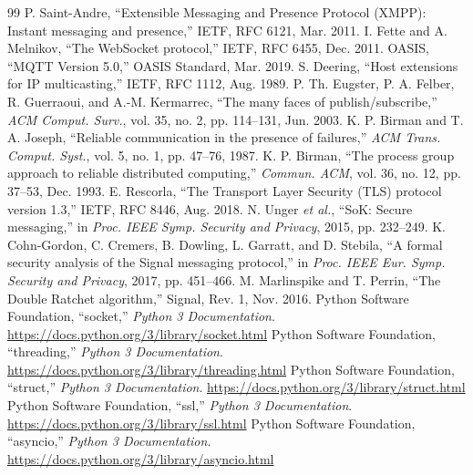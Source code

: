 \documentclass[conference]{IEEEtran}
\begin{document}
\begin{thebibliography}{99}
 P. Saint-Andre, ``Extensible Messaging and Presence Protocol (XMPP): Instant messaging and presence,'' IETF, RFC 6121, Mar. 2011.
 I. Fette and A. Melnikov, ``The WebSocket protocol,'' IETF, RFC 6455, Dec. 2011.
 OASIS, ``MQTT Version 5.0,'' OASIS Standard, Mar. 2019.
 S. Deering, ``Host extensions for IP multicasting,'' IETF, RFC 1112, Aug. 1989.
 P. Th. Eugster, P. A. Felber, R. Guerraoui, and A.-M. Kermarrec, ``The many faces of publish/subscribe,'' \emph{ACM Comput. Surv.}, vol. 35, no. 2, pp. 114--131, Jun. 2003.
 K. P. Birman and T. A. Joseph, ``Reliable communication in the presence of failures,'' \emph{ACM Trans. Comput. Syst.}, vol. 5, no. 1, pp. 47--76, 1987.
 K. P. Birman, ``The process group approach to reliable distributed computing,'' \emph{Commun. ACM}, vol. 36, no. 12, pp. 37--53, Dec. 1993.
 E. Rescorla, ``The Transport Layer Security (TLS) protocol version 1.3,'' IETF, RFC 8446, Aug. 2018.
 N. Unger \emph{et al.}, ``SoK: Secure messaging,'' in \emph{Proc. IEEE Symp. Security and Privacy}, 2015, pp. 232--249.
 K. Cohn-Gordon, C. Cremers, B. Dowling, L. Garratt, and D. Stebila, ``A formal security analysis of the Signal messaging protocol,'' in \emph{Proc. IEEE Eur. Symp. Security and Privacy}, 2017, pp. 451--466.
 M. Marlinspike and T. Perrin, ``The Double Ratchet algorithm,'' Signal, Rev. 1, Nov. 2016.
 Python Software Foundation, ``socket,'' \emph{Python 3 Documentation}. \url{https://docs.python.org/3/library/socket.html}
 Python Software Foundation, ``threading,'' \emph{Python 3 Documentation}. \url{https://docs.python.org/3/library/threading.html}
 Python Software Foundation, ``struct,'' \emph{Python 3 Documentation}. \url{https://docs.python.org/3/library/struct.html}
 Python Software Foundation, ``ssl,'' \emph{Python 3 Documentation}. \url{https://docs.python.org/3/library/ssl.html}
 Python Software Foundation, ``asyncio,'' \emph{Python 3 Documentation}. \url{https://docs.python.org/3/library/asyncio.html}
\end{thebibliography}
\end{document}

